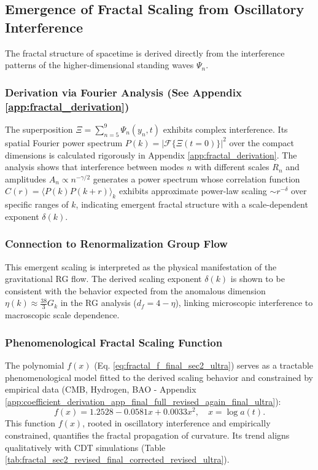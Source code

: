 \documentclass[12pt, a4paper]{article} %
\begin{document}
\subsection{Emergence of Fractal Scaling from Oscillatory Interference}
The fractal structure of spacetime is derived directly from the interference patterns of the higher-dimensional standing waves \(\Psi_n\).

\subsubsection*{Derivation via Fourier Analysis (See Appendix \ref{app:fractal_derivation})}
The superposition \( \Xi = \sum_{n=5}^9 \Psi_n(y_n, t) \) exhibits complex interference. Its spatial Fourier power spectrum \(P(k) = |\mathcal{F}\{\Xi(t=0)\}|^2\) over the compact dimensions is calculated rigorously in Appendix \ref{app:fractal_derivation}. The analysis shows that interference between modes \(n\) with different scales \(R_n\) and amplitudes \(A_n \propto n^{-\gamma/2}\) generates a power spectrum whose correlation function \( C(r) = \langle P(k) P(k+r) \rangle_k \) exhibits approximate power-law scaling \( \sim r^{-\delta} \) over specific ranges of \(k\), indicating emergent fractal structure with a scale-dependent exponent \( \delta(k) \).

\subsubsection*{Connection to Renormalization Group Flow}
This emergent scaling is interpreted as the physical manifestation of the gravitational RG flow. The derived scaling exponent \( \delta(k) \) is shown to be consistent with the behavior expected from the anomalous dimension \( \eta(k) \approx \frac{38}{3}G_k \) in the RG analysis (\(d_f = 4 - \eta\)), linking microscopic interference to macroscopic scale dependence.

\subsubsection*{Phenomenological Fractal Scaling Function}
The polynomial \(f(x)\) (Eq. \ref{eq:fractal_f_final_sec2_ultra}) serves as a tractable phenomenological model fitted to the derived scaling behavior and constrained by empirical data (CMB, Hydrogen, BAO - Appendix \ref{app:coefficient_derivation_app_final_full_revised_again_final_ultra}):
\begin{equation}
f(x) = 1.2528 - 0.0581x + 0.0033x^2, \quad x = \log a(t).
\label{eq:fractal_f_final_sec2_ultra}
\end{equation}
This function \(f(x)\), rooted in oscillatory interference and empirically constrained, quantifies the fractal propagation of curvature. Its trend aligns qualitatively with CDT simulations \cite{ambjorn2012quantum} (Table \ref{tab:fractal_sec2_revised_final_corrected_revised_ultra}).
\end{document}
